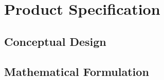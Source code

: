 %
%
%
%
%

\chapter{Product Specification}\label{ch:spec}

\section{Conceptual Design}
\label{sec:conceptual_design}



\section{Mathematical Formulation}
\label{sec:mathematics}


